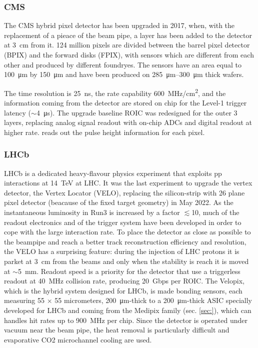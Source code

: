         \subsubsection{CMS}
        The CMS hybrid pixel detector has been upgraded in 2017, when, with the replacement of a pieace of the beam pipe, a layer has been added to the detector at \SI{3}{cm} from it.
        124 million pixels are divided between the barrel pixel detector (BPIX) and the forward disks (FPIX), with sensors which are different from each other and produced by different foundryes. 
        The sensors have an area equal to \SI{100}{\um} by \SI{150}{\um} and have been produced on \SIrange{285}{300}{\um} thick wafers.
    
        The time resolution is \SI{25}{ns}, the rate capability  \SI{600}{MHz/cm\squared}, and the information coming from the detector are stored on chip for the Level-1 trigger latency ($\sim$\SI{4}{\us}).   
        The upgrade baseline ROIC was redesigned for the outer 3 layers, replacing analog signal readout with on-chip ADCs and digital readout at higher rate. reads out the pulse height information for each pixel. 

        \subsubsection{LHCb}
        LHCb is a dedicated heavy-flavour physics experiment that exploits pp interactions at \SI{14}{TeV} at LHC. 
        It was the last experiment to upgrade the vertex detector, the Vertex Locator (VELO), replacing the silicon-strip with 26 plane pixel detector (beacause of the fixed target geometry) in May 2022. 
        As the instantaneous luminosity in Run3 is increased by a factor $\lesssim$10, much of the readout electronics and of the trigger system have been developed in order to cope with the large interaction rate.
        To place the detector as close as possible to the beampipe and reach a better track reconstruction efficiency and resolution, the VELO has a surprising feature: during the injection of LHC protons it is parket at \SI{3}{cm} from the beams and only when the stability is reach it is moved at $\sim$\SI{5}{mm}. Readout speed is a priority for the detector that use a triggerless readout at \SI{40}{MHz} collision rate, producing \SI{20}{Gbps} per ROIC. 
        The Velopix, which is the hybrid system designed for LHCb, is made bonding sensors, each measuring 55 $\times$ 55 micrometers, \SI{200}{\um}-thick to a \SI{200}{\um}-thick ASIC specially developed for LHCb and coming from the Medipix family (sec. \ref{sec:}), which can handles hit rates up to \SI{900}{MHz} per chip. 
        Since the detector is operated under vacuum near the beam pipe, the heat removal is particularly difficult and evaporative CO2 microchannel cooling are used. 


